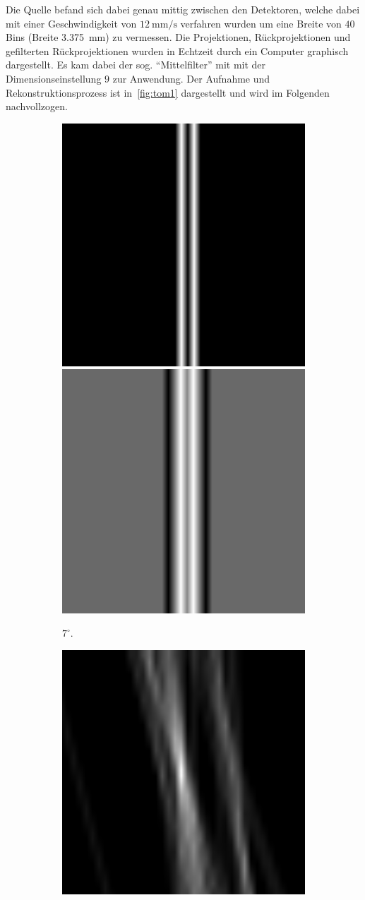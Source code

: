 \documentclass[slug=PET, room=Andreas-Schubert-Bau\,\ 424A, supervisor=Carsten\ Bittrich, coursedate=10.\ 01.\ 2020]{../../Lab_Report_LaTeX/lab_report}
\begin{document}
Die Quelle befand sich dabei genau mittig zwischen den Detektoren,
welche dabei mit einer Geschwindigkeit von
\(\SI{12}{\milli\metre\per\second}\) verfahren wurden um eine Breite
von \(40\) Bins (Breite \SI{3.375}{\milli\meter}) zu vermessen. Die
Projektionen, R\"uckprojektionen und gefilterten R\"uckprojektionen
wurden in Echtzeit durch ein Computer graphisch dargestellt. Es kam
dabei der sog. ``Mittelfilter'' mit mit der Dimensionseinstellung
\(9\) zur Anwendung. Der Aufnahme und Rekonstruktionsprozess ist
in~\ref{fig:tom1} dargestellt und wird im Folgenden nachvollzogen.

\begin{figure}[htp]
  \begin{subfigure}{0.5\textwidth}
    \centering
    \includegraphics[width=.4\textwidth]{../messungen/oliTOM1/1_einfach.png}
    \includegraphics[width=.4\textwidth]{../messungen/oliTOM1/1_gefiltert.png}
    \caption{\(7^\circ\).}
    \label{eq:tom1-7}
  \end{subfigure}
  \begin{subfigure}{0.5\textwidth}
    \centering
    \includegraphics[width=.4\textwidth]{../messungen/oliTOM1/3_einfach.png}

\end{subfigure}
\end{figure}
\end{document}
